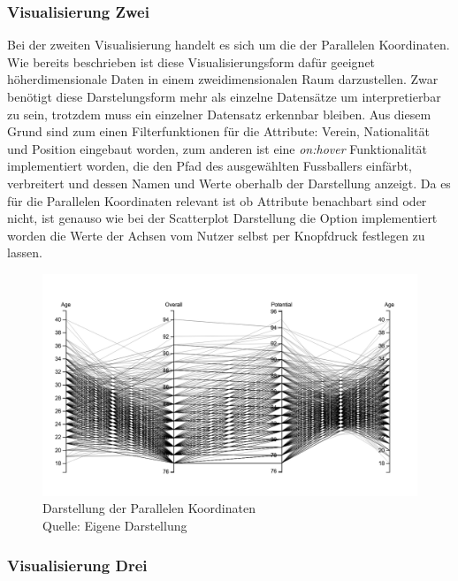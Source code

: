 \documentclass[usegeometry=true]{scrartcl}
\begin{document}
\subsubsection{Visualisierung Zwei}
Bei der zweiten Visualisierung handelt es sich um die der Parallelen Koordinaten. 
Wie bereits beschrieben ist diese Visualisierungsform dafür geeignet höherdimensionale Daten in einem zweidimensionalen Raum darzustellen. Zwar benötigt diese Darstelungsform mehr als einzelne Datensätze um interpretierbar zu sein, trotzdem muss ein einzelner Datensatz erkennbar bleiben. Aus diesem Grund sind zum einen Filterfunktionen für die Attribute: Verein, Nationalität und Position eingebaut worden, zum anderen ist eine \textit{on:hover} Funktionalität implementiert worden, die den Pfad des ausgewählten Fussballers einfärbt, verbreitert und dessen Namen und Werte oberhalb der Darstellung anzeigt.
Da es für die Parallelen Koordinaten relevant ist ob Attribute benachbart sind oder nicht, ist genauso wie bei der Scatterplot Darstellung die Option implementiert worden die Werte der Achsen vom Nutzer selbst per Knopfdruck festlegen zu lassen.

\begin{figure}[h!]
\centering
\includegraphics[scale=0.4]{grafiken/ParalleleKoordinaten1}
\caption{Darstellung der Parallelen Koordinaten\\ Quelle: Eigene Darstellung}
\end{figure}






\subsubsection{Visualisierung Drei}
\end{document}
